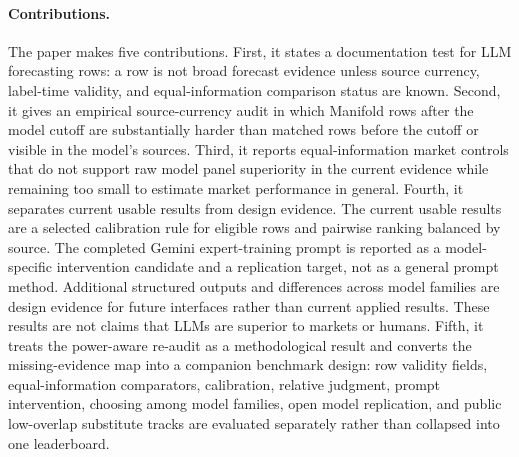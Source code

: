 \documentclass[11pt]{article}
\begin{document}
\paragraph{Contributions.} The paper makes five contributions. First, it states a documentation test for LLM forecasting rows: a row is not broad forecast evidence unless source currency, label-time validity, and equal-information comparison status are known. Second, it gives an empirical source-currency audit in which Manifold rows after the model cutoff are substantially harder than matched rows before the cutoff or visible in the model's sources. Third, it reports equal-information market controls that do not support raw model panel superiority in the current evidence while remaining too small to estimate market performance in general. Fourth, it separates current usable results from design evidence. The current usable results are a selected calibration rule for eligible rows and pairwise ranking balanced by source. The completed Gemini expert-training prompt is reported as a model-specific intervention candidate and a replication target, not as a general prompt method. Additional structured outputs and differences across model families are design evidence for future interfaces rather than current applied results. These results are not claims that LLMs are superior to markets or humans. Fifth, it treats the power-aware re-audit as a methodological result and converts the missing-evidence map into a companion benchmark design: row validity fields, equal-information comparators, calibration, relative judgment, prompt intervention, choosing among model families, open model replication, and public low-overlap substitute tracks are evaluated separately rather than collapsed into one leaderboard.
\end{document}
